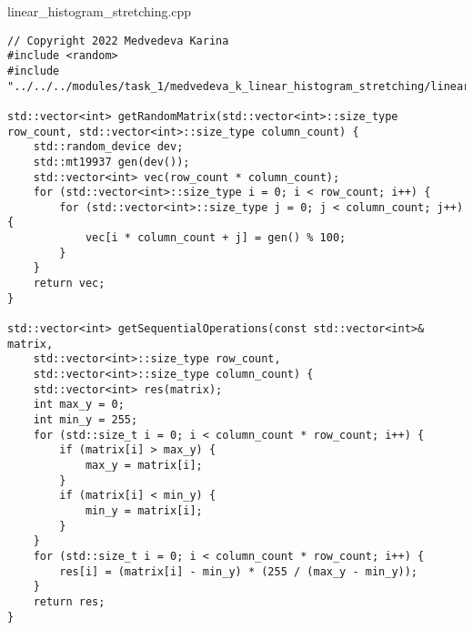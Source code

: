\documentclass{report}
\begin{document}
\par linear\_histogram\_stretching.cpp
\begin{lstlisting}
// Copyright 2022 Medvedeva Karina
#include <random>
#include "../../../modules/task_1/medvedeva_k_linear_histogram_stretching/linear_histogram_stretching.h"

std::vector<int> getRandomMatrix(std::vector<int>::size_type row_count, std::vector<int>::size_type column_count) {
    std::random_device dev;
    std::mt19937 gen(dev());
    std::vector<int> vec(row_count * column_count);
    for (std::vector<int>::size_type i = 0; i < row_count; i++) {
        for (std::vector<int>::size_type j = 0; j < column_count; j++) {
            vec[i * column_count + j] = gen() % 100;
        }
    }
    return vec;
}

std::vector<int> getSequentialOperations(const std::vector<int>& matrix,
    std::vector<int>::size_type row_count,
    std::vector<int>::size_type column_count) {
    std::vector<int> res(matrix);
    int max_y = 0;
    int min_y = 255;
    for (std::size_t i = 0; i < column_count * row_count; i++) {
        if (matrix[i] > max_y) {
            max_y = matrix[i];
        }
        if (matrix[i] < min_y) {
            min_y = matrix[i];
        }
    }
    for (std::size_t i = 0; i < column_count * row_count; i++) {
        res[i] = (matrix[i] - min_y) * (255 / (max_y - min_y));
    }
    return res;
}
\end{lstlisting}
\end{document}
